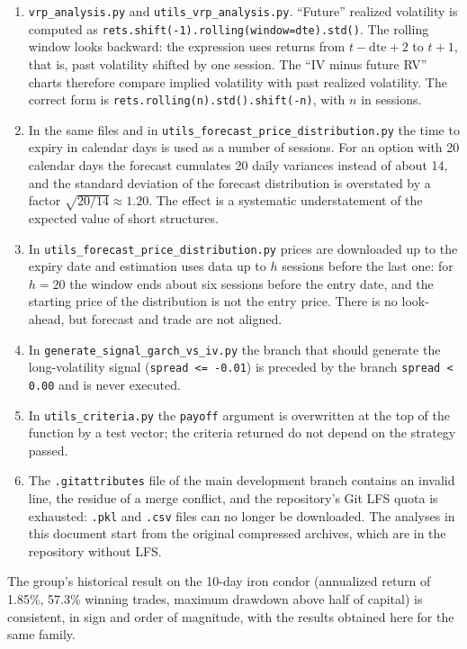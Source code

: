 \documentclass[11pt,a4paper]{article}
\begin{document}
\begin{enumerate}
\item \texttt{vrp\_analysis.py} and \texttt{utils\_vrp\_analysis.py}. ``Future'' realized volatility is computed as \texttt{rets.shift(-1).rolling(window=dte).std()}. The rolling window looks backward: the expression uses returns from $t-\mathrm{dte}+2$ to $t+1$, that is, past volatility shifted by one session. The ``IV minus future RV'' charts therefore compare implied volatility with past realized volatility. The correct form is \texttt{rets.rolling(n).std().shift(-n)}, with $n$ in sessions.
\item In the same files and in \texttt{utils\_forecast\_price\_distribution.py} the time to expiry in calendar days is used as a number of sessions. For an option with 20 calendar days the forecast cumulates 20 daily variances instead of about 14, and the standard deviation of the forecast distribution is overstated by a factor $\sqrt{20/14}\approx 1.20$. The effect is a systematic understatement of the expected value of short structures.
\item In \texttt{utils\_forecast\_price\_distribution.py} prices are downloaded up to the expiry date and estimation uses data up to $h$ sessions before the last one: for $h=20$ the window ends about six sessions before the entry date, and the starting price of the distribution is not the entry price. There is no look-ahead, but forecast and trade are not aligned.
\item In \texttt{generate\_signal\_garch\_vs\_iv.py} the branch that should generate the long-volatility signal (\texttt{spread <= -0.01}) is preceded by the branch \texttt{spread < 0.00} and is never executed.
\item In \texttt{utils\_criteria.py} the \texttt{payoff} argument is overwritten at the top of the function by a test vector; the criteria returned do not depend on the strategy passed.
\item The \texttt{.gitattributes} file of the main development branch contains an invalid line, the residue of a merge conflict, and the repository's Git LFS quota is exhausted: \texttt{.pkl} and \texttt{.csv} files can no longer be downloaded. The analyses in this document start from the original compressed archives, which are in the repository without LFS.
\end{enumerate}

The group's historical result on the 10-day iron condor (annualized return of 1.85\%, 57.3\% winning trades, maximum drawdown above half of capital) is consistent, in sign and order of magnitude, with the results obtained here for the same family.
\end{document}
